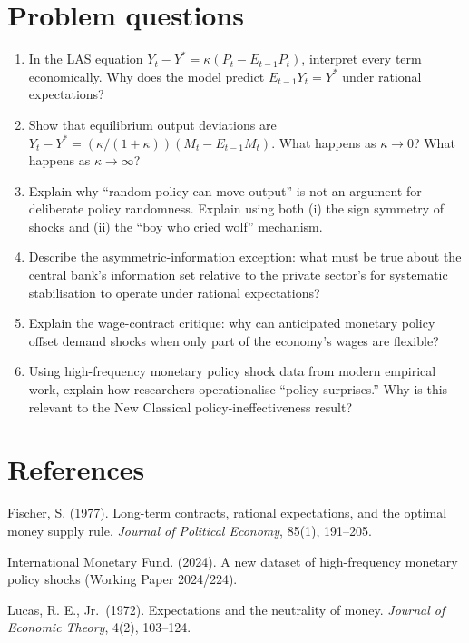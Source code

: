 \documentclass[
  letterpaper,
  DIV=11,
  numbers=noendperiod]{scrartcl}
\begin{document}
\section{Problem questions}\label{problem-questions-1}

\begin{enumerate}
\def\labelenumi{\arabic{enumi}.}
\item
  In the LAS equation \(Y_t - Y^* = \kappa(P_t - E_{t-1}P_t)\),
  interpret every term economically. Why does the model predict
  \(E_{t-1}Y_t = Y^*\) under rational expectations?
\item
  Show that equilibrium output deviations are
  \(Y_t - Y^* = (\kappa/(1+\kappa))(M_t - E_{t-1}M_t)\). What happens as
  \(\kappa \to 0\)? What happens as \(\kappa \to \infty\)?
\item
  Explain why ``random policy can move output'' is not an argument for
  deliberate policy randomness. Explain using both (i) the sign symmetry
  of shocks and (ii) the ``boy who cried wolf'' mechanism.
\item
  Describe the asymmetric-information exception: what must be true about
  the central bank's information set relative to the private sector's
  for systematic stabilisation to operate under rational expectations?
\item
  Explain the wage-contract critique: why can anticipated monetary
  policy offset demand shocks when only part of the economy's wages are
  flexible?
\item
  Using high-frequency monetary policy shock data from modern empirical
  work, explain how researchers operationalise ``policy surprises.'' Why
  is this relevant to the New Classical policy-ineffectiveness result?
\end{enumerate}

\section{References}\label{references-1}

Fischer, S. (1977). Long-term contracts, rational expectations, and the
optimal money supply rule. \emph{Journal of Political Economy}, 85(1),
191--205.

International Monetary Fund. (2024). A new dataset of high-frequency
monetary policy shocks (Working Paper 2024/224).

Lucas, R. E., Jr.~(1972). Expectations and the neutrality of money.
\emph{Journal of Economic Theory}, 4(2), 103--124.
\end{document}

